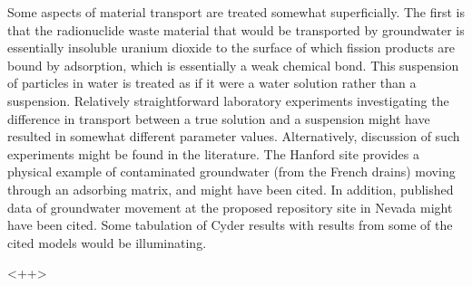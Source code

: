 \documentclass[answers,12pt]{exam}
\begin{document}
\begin{questions}
\question  Some aspects of material transport are treated somewhat superficially. The
first is that the radionuclide waste material that would be transported by
groundwater is essentially insoluble uranium dioxide to the surface of which
fission products are bound by adsorption, which is essentially a weak chemical
bond.  This suspension of particles in water is treated as if it were a water
solution rather than a suspension.  Relatively straightforward laboratory
experiments investigating the difference in transport between a true solution
and a suspension might have resulted in somewhat different parameter values.
Alternatively, discussion of such experiments might be found in the literature.
The Hanford site provides a physical example of contaminated groundwater (from
the French drains) moving through an adsorbing matrix, and might have been
cited. In addition, published data of groundwater movement at the proposed
repository site in Nevada might have been cited.  Some tabulation of Cyder
results with results from some of the cited models would be illuminating. 
\begin{solution}
<++>
\end{solution}

\end{questions}
  
\end{document}
